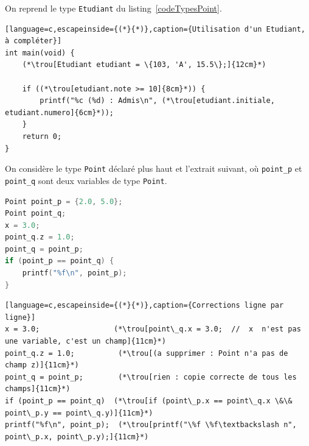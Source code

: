 
\begin{UPSTIactivite}
On reprend le type \texttt{Etudiant} du listing~\ref{codeTypesPoint}.
\begin{lstlisting}[language=c,escapeinside={(*}{*)},caption={Utilisation d'un Etudiant, à compléter}]
int main(void) {
    (*\trou[Etudiant etudiant = \{103, 'A', 15.5\};]{12cm}*)

    if ((*\trou[etudiant.note >= 10]{8cm}*)) {
        printf("%c (%d) : Admis\n", (*\trou[etudiant.initiale, etudiant.numero]{6cm}*));
    }
    return 0;
}
\end{lstlisting}
\end{UPSTIactivite}

\begin{UPSTIactivite}
On considère le type \texttt{Point} déclaré plus haut et l'extrait suivant, où \texttt{point\_p} et \texttt{point\_q} sont deux variables de type \texttt{Point}.
\begin{lstlisting}[language=c,caption={Extrait à corriger},label=codeErreursStruct]
Point point_p = {2.0, 5.0};
Point point_q;
x = 3.0;
point_q.z = 1.0;
point_q = point_p;
if (point_p == point_q) {
    printf("%f\n", point_p);
}
\end{lstlisting}
\begin{lstlisting}[language=c,escapeinside={(*}{*)},caption={Corrections ligne par ligne}]
x = 3.0;                 (*\trou[point\_q.x = 3.0;  //  x  n'est pas une variable, c'est un champ]{11cm}*)
point_q.z = 1.0;          (*\trou[(a supprimer : Point n'a pas de champ z)]{11cm}*)
point_q = point_p;        (*\trou[rien : copie correcte de tous les champs]{11cm}*)
if (point_p == point_q)  (*\trou[if (point\_p.x == point\_q.x \&\& point\_p.y == point\_q.y)]{11cm}*)
printf("%f\n", point_p);  (*\trou[printf("\%f \%f\textbackslash n", point\_p.x, point\_p.y);]{11cm}*)
\end{lstlisting}
\end{UPSTIactivite}
